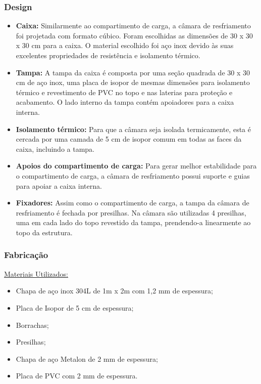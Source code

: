 \subsubsection{Design}

\begin{itemize}
	\item \textbf{Caixa:} Similarmente ao compartimento de carga, a câmara de resfriamento foi projetada com formato cúbico. Foram escolhidas as dimensões de 30 x 30 x 30 cm para a caixa. O material escolhido foi aço inox devido às suas excelentes propriedades de resistência e isolamento térmico.
	\item \textbf{Tampa:} A tampa da caixa é composta por uma seção quadrada de 30 x 30 cm de aço inox, uma placa de isopor de mesmas dimensões para isolamento térmico e revestimento de PVC no topo e nas laterias para proteção e acabamento. O lado interno da tampa contém apoiadores para a caixa interna.
	\item \textbf{Isolamento térmico:} Para que a câmara seja isolada termicamente, esta é cercada por uma camada de 5 cm de isopor comum em todas as faces da caixa, incluindo a tampa.
	\item \textbf{Apoios do compartimento de carga:} Para gerar melhor estabilidade para o compartimento de carga, a câmara de resfriamento possui suporte e guias para apoiar a caixa interna.
	\item \textbf{ Fixadores:} Assim como o compartimento de carga, a tampa da câmara de resfriamento é fechada por presilhas. Na câmara são utilizadas 4 presilhas, uma em cada lado do topo revestido da tampa, prendendo-a linearmente ao topo da estrutura.
\end{itemize}

\subsubsection{Fabricação}

\underline{Materiais Utilizados:}

\begin{itemize}
	\item Chapa de aço inox 304L de 1m x 2m com 1,2 mm de espessura;
	\item Placa de Isopor de 5 cm de espessura;
	\item Borrachas;
	\item Presilhas;
	\item Chapa de aço Metalon de 2 mm de espessura;
	\item Placa de PVC com 2 mm de espessura.
\end{itemize}

